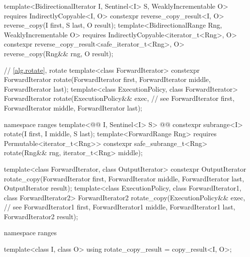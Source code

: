 \begin{addedblock}
\begin{codeblock}
{    template<BidirectionalIterator I, Sentinel<I> S, WeaklyIncrementable O>
      requires IndirectlyCopyable<I, O>
      constexpr reverse_copy_result<I, O>
        reverse_copy(I first, S last, O result);
    template<BidirectionalRange Rng, WeaklyIncrementable O>
      requires IndirectlyCopyable<iterator_t<Rng>, O>
      constexpr reverse_copy_result<safe_iterator_t<Rng>, O>
        reverse_copy(Rng&& rng, O result);
  }
\end{codeblock}\end{addedblock}\begin{codeblock}

  // \ref{alg.rotate}, rotate
  template<class ForwardIterator>
    constexpr ForwardIterator rotate(ForwardIterator first,
                                     ForwardIterator middle,
                                     ForwardIterator last);
  template<class ExecutionPolicy, class ForwardIterator>
    ForwardIterator rotate(ExecutionPolicy&& exec, // see 
                           ForwardIterator first,
                           ForwardIterator middle,
                           ForwardIterator last);
\end{codeblock}\begin{addedblock}\begin{codeblock}
  namespace ranges {
    template<@@ I, Sentinel<I> S>
      @@
      constexpr subrange<I> rotate(I first, I middle, S last);
    template<ForwardRange Rng>
      requires Permutable<iterator_t<Rng>>
      constexpr safe_subrange_t<Rng> rotate(Rng&& rng, iterator_t<Rng> middle);
  }
\end{codeblock}\end{addedblock}\begin{codeblock}
  template<class ForwardIterator, class OutputIterator>
    constexpr OutputIterator
      rotate_copy(ForwardIterator first, ForwardIterator middle,
                  ForwardIterator last, OutputIterator result);
  template<class ExecutionPolicy, class ForwardIterator1, class ForwardIterator2>
    ForwardIterator2
      rotate_copy(ExecutionPolicy&& exec, // see 
                  ForwardIterator1 first, ForwardIterator1 middle,
                  ForwardIterator1 last, ForwardIterator2 result);
\end{codeblock}\begin{addedblock}\begin{codeblock}
  namespace ranges {
    template<class I, class O>
    using rotate_copy_result = copy_result<I, O>;

}
\end{codeblock}
\end{addedblock}
